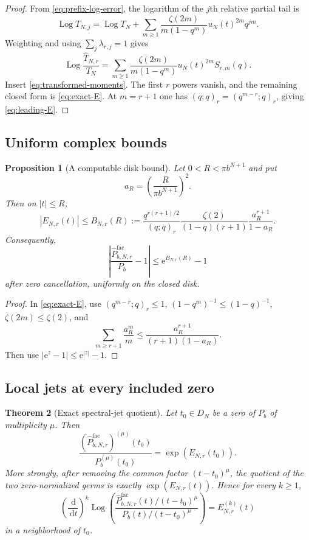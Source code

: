 \documentclass[11pt,oneside]{article}
\numberwithin{equation}{section}
\theoremstyle{frontier}
\newtheorem{theorem}{Theorem}[section]
\newtheorem{proposition}[theorem]{Proposition}
\theoremstyle{definition}
\theoremstyle{remark}
\newcommand{\Log}{\operatorname{Log}}
\newcommand{\dd}{\,\mathrm d}
\newcommand{\e}{\mathrm e}
\begin{document}
\begin{proof}
From \eqref{eq:prefix-log-error}, the logarithm of the $j$th relative partial tail is
\[
 \Log T_{N,j}
 =\Log T_N+
 \sum_{m\ge1}\frac{\zeta(2m)}{m(1-q^m)}u_N(t)^{2m}q^{jm}.
\]
Weighting and using $\sum_j\lambda_{r,j}=1$ gives
\[
 \Log\frac{\widehat T_{N,r}}{T_N}
 =\sum_{m\ge1}\frac{\zeta(2m)}{m(1-q^m)}u_N(t)^{2m}S_{r,m}(q).
\]
Insert \eqref{eq:transformed-moments}.  The first $r$ powers vanish, and the remaining
closed form is \eqref{eq:exact-E}.  At $m=r+1$ one has
$(q;q)_r=(q^{m-r};q)_r$, giving \eqref{eq:leading-E}.
\end{proof}

\subsection{Uniform complex bounds}

\begin{proposition}[A computable disk bound]\label{prop:disk-bound}
Let $0<R<\pi b^{N+1}$ and put
\[
 a_R=\left(\frac{R}{\pi b^{N+1}}\right)^2.
\]
Then on $|t|\le R$,
\begin{equation}
 |E_{N,r}(t)|\le B_{N,r}(R)
 :=\frac{q^{r(r+1)/2}}{(q;q)_r}
   \frac{\zeta(2)}{(1-q)(r+1)}
   \frac{a_R^{r+1}}{1-a_R}.
 \label{eq:Bbound}
\end{equation}
Consequently,
\begin{equation}
 \left|\frac{\widehat P^{\mathrm{fac}}_{b,N,r}}{P_b}-1\right|
 \le \e^{B_{N,r}(R)}-1
 \label{eq:relative-bound}
\end{equation}
after zero cancellation, uniformly on the closed disk.
\end{proposition}

\begin{proof}
In \eqref{eq:exact-E}, use
$(q^{m-r};q)_r\le1$, $(1-q^m)^{-1}\le(1-q)^{-1}$,
$\zeta(2m)\le\zeta(2)$, and
\[
 \sum_{m\ge r+1}\frac{a_R^m}{m}
 \le\frac{a_R^{r+1}}{(r+1)(1-a_R)}.
\]
Then use $|\e^z-1|\le\e^{|z|}-1$.
\end{proof}

\subsection{Local jets at every included zero}

\begin{theorem}[Exact spectral-jet quotient]\label{thm:jet-quotient}
Let $t_0\in D_N$ be a zero of $P_b$ of multiplicity $\mu$.  Then
\begin{equation}
 \frac{(\widehat P^{\mathrm{fac}}_{b,N,r})^{(\mu)}(t_0)}
      {P_b^{(\mu)}(t_0)}
 =\exp(E_{N,r}(t_0)).
 \label{eq:first-derivative-ratio}
\end{equation}
More strongly, after removing the common factor $(t-t_0)^\mu$, the quotient of the two
zero-normalized germs is exactly $\exp(E_{N,r}(t))$.  Hence for every $k\ge1$,
\begin{equation}
 \left(\frac{\dd}{\dd t}\right)^k
 \Log\!\left(
 \frac{\widehat P^{\mathrm{fac}}_{b,N,r}(t)/(t-t_0)^\mu}
      {P_b(t)/(t-t_0)^\mu}
 \right)
 =E_{N,r}^{(k)}(t)
 \label{eq:jet-log-derivatives}
\end{equation}
in a neighborhood of $t_0$.
\end{theorem}
\end{document}
